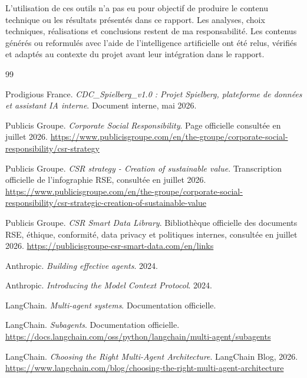 \documentclass[a4paper,11pt,english,openany]{book}
\begin{document}
L'utilisation de ces outils n'a pas eu pour objectif de produire le contenu
technique ou les résultats présentés dans ce rapport. Les analyses, choix
techniques, réalisations et conclusions restent de ma responsabilité.
Les contenus générés ou reformulés avec l'aide de l'intelligence artificielle
ont été relus, vérifiés et adaptés au contexte du projet avant leur
intégration dans le rapport.

\begin{thebibliography}{99}

Prodigious France.
\textit{CDC\_Spielberg\_v1.0 : Projet Spielberg, plateforme de données et assistant IA interne}.
Document interne, mai 2026.

Publicis Groupe.
\textit{Corporate Social Responsibility}.
Page officielle consultée en juillet 2026.
\url{https://www.publicisgroupe.com/en/the-groupe/corporate-social-responsibility/csr-strategy}

Publicis Groupe.
\textit{CSR strategy - Creation of sustainable value}.
Transcription officielle de l'infographie RSE, consultée en juillet 2026.
\url{https://www.publicisgroupe.com/en/the-groupe/corporate-social-responsibility/csr-strategic-creation-of-sustainable-value}

Publicis Groupe.
\textit{CSR Smart Data Library}.
Bibliothèque officielle des documents RSE, éthique, conformité, data privacy et politiques internes, consultée en juillet 2026.
\url{https://publicisgroupe-csr-smart-data.com/en/links}

Anthropic.
\textit{Building effective agents}.
2024.

Anthropic.
\textit{Introducing the Model Context Protocol}.
2024.

LangChain.
\textit{Multi-agent systems}.
Documentation officielle.

LangChain.
\textit{Subagents}.
Documentation officielle.
\url{https://docs.langchain.com/oss/python/langchain/multi-agent/subagents}

LangChain.
\textit{Choosing the Right Multi-Agent Architecture}.
LangChain Blog, 2026.
\url{https://www.langchain.com/blog/choosing-the-right-multi-agent-architecture}


\end{thebibliography}
\end{document}
